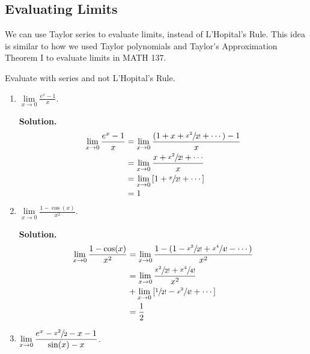 \subsection*{Evaluating Limits}
We can use Taylor series to evaluate limits, instead
of L'Hopital's Rule. This idea is similar to how we used Taylor
polynomials and Taylor's Approximation Theorem I to evaluate
limits in MATH 137.

\begin{Example}{}{}
    Evaluate with series and not L'Hopital's Rule.

    \begin{enumerate}[label=(\roman*)]
        \item $ \displaystyle \lim\limits_{{x} \to {0}} \frac{e^x-1}{x} $.

              \textbf{Solution.}
              \begin{align*}
                  \lim\limits_{{x} \to {0}} \frac{e^x-1}{x}
                   & =\lim\limits_{{x} \to {0}} \frac{\left( 1+x+\sfrac{x^2}{2!} +\cdots \right)-1}{x} \\
                   & =\lim\limits_{{x} \to {0}}
                  \frac{x+\sfrac{x^2}{2!} +\cdots}{x}                                                  \\
                   & =\lim\limits_{{x} \to {0}} \left[ 1+\sfrac{x}{2!}+\cdots \right]                  \\
                   & =1
              \end{align*}

        \item $ \displaystyle \lim\limits_{{x} \to {0}} \frac{1-\cos(x)}{x^2} $.

              \textbf{Solution.}
              \begin{align*}
                  \lim\limits_{{x} \to {0}} \frac{1-\cos(x)}{x^2}
                   & =\lim\limits_{{x} \to {0}}
                  \frac{1-\left( 1-\sfrac{x^2}{2!} +\sfrac{x^4}{4!} -\cdots \right)}{x^2}             \\
                   & =\lim\limits_{{x} \to {0}} \frac{\sfrac{x^2}{2!}+\sfrac{x^4}{4!} }{x^2}          \\
                   & +\lim\limits_{{x} \to {0}} \left[ \sfrac{1}{2!} -\sfrac{x^2}{4!} +\cdots \right] \\
                   & =\frac{1}{2}
              \end{align*}

        \item $ \displaystyle \lim\limits_{{x} \to {0}} \frac{e^x-\sfrac{x^2}{2} -x-1}{\sin(x)-x} $.


\end{enumerate}
\end{Example}
